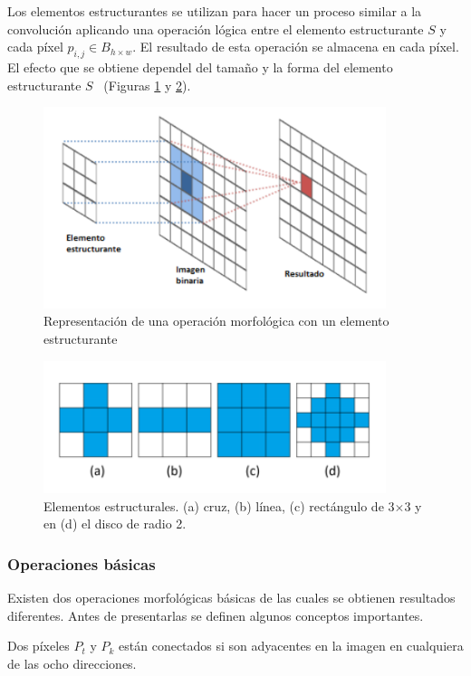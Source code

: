 Los elementos estructurantes se utilizan para hacer un proceso similar a la convolución aplicando una operación lógica entre el elemento estructurante $S$ y cada píxel $p_{i, j} \in B_{h \times w}$. El resultado de esta operación se almacena en cada píxel. El efecto que se obtiene dependel del tamaño y la forma del elemento estructurante $S$~\cite{castleman1996digital} (Figuras \ref{fig:estructurante} y \ref{fig:kernel}).

\begin{figure}[ht]
	\centering
	\includegraphics[width=10cm]{./Graphics/estructurante.png}
	\caption{Representación de una operación morfológica con un elemento estructurante}
	\label{fig:estructurante}
\end{figure}	

\begin{figure}[ht]
	\centering
	\includegraphics[width=10cm]{./Graphics/kernel.png}
	\caption{Elementos estructurales. (a) cruz, (b) línea, (c) rectángulo de 3$\times$3 y en (d) el disco de radio 2.}
	\label{fig:kernel}
\end{figure}

\subsubsection{Operaciones básicas}

Existen dos operaciones morfológicas básicas de las cuales se obtienen resultados diferentes. Antes de presentarlas se definen algunos conceptos importantes.

\begin{definition}
	Dos píxeles $P_t$ y $P_k$ están conectados si son adyacentes en la imagen en cualquiera de las ocho direcciones.
\end{definition}


